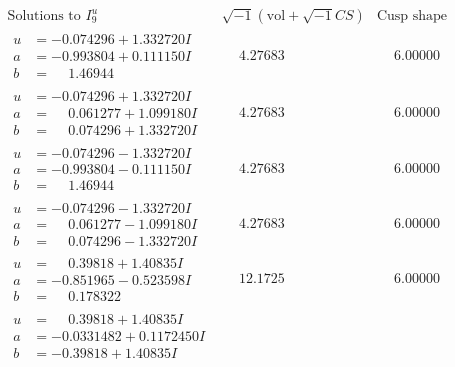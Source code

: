 \documentclass[1p]{elsarticle_modified}
\theoremstyle{definition}
\newcommand{\I}{\sqrt{-1}}
\begin{document}
$$\begin{array}{c|c|c}  
\text{Solutions to }I^u_{9}& \I (\text{vol} + \sqrt{-1}CS) & \text{Cusp shape}\\
 \hline 
\begin{aligned}
u &= -0.074296 + 1.332720 I \\
a &= -0.993804 + 0.111150 I \\
b &= \phantom{-}1.46944\phantom{ +0.000000I}\end{aligned}
 & \phantom{-}4.27683\phantom{ +0.000000I} & \phantom{-}6.00000\phantom{ +0.000000I} \\ \hline\begin{aligned}
u &= -0.074296 + 1.332720 I \\
a &= \phantom{-}0.061277 + 1.099180 I \\
b &= \phantom{-}0.074296 + 1.332720 I\end{aligned}
 & \phantom{-}4.27683\phantom{ +0.000000I} & \phantom{-}6.00000\phantom{ +0.000000I} \\ \hline\begin{aligned}
u &= -0.074296 - 1.332720 I \\
a &= -0.993804 - 0.111150 I \\
b &= \phantom{-}1.46944\phantom{ +0.000000I}\end{aligned}
 & \phantom{-}4.27683\phantom{ +0.000000I} & \phantom{-}6.00000\phantom{ +0.000000I} \\ \hline\begin{aligned}
u &= -0.074296 - 1.332720 I \\
a &= \phantom{-}0.061277 - 1.099180 I \\
b &= \phantom{-}0.074296 - 1.332720 I\end{aligned}
 & \phantom{-}4.27683\phantom{ +0.000000I} & \phantom{-}6.00000\phantom{ +0.000000I} \\ \hline\begin{aligned}
u &= \phantom{-}0.39818 + 1.40835 I \\
a &= -0.851965 - 0.523598 I \\
b &= \phantom{-}0.178322\phantom{ +0.000000I}\end{aligned}
 & \phantom{-}12.1725\phantom{ +0.000000I} & \phantom{-}6.00000\phantom{ +0.000000I} \\ \hline\begin{aligned}
u &= \phantom{-}0.39818 + 1.40835 I \\
a &= -0.0331482 + 0.1172450 I \\
b &= -0.39818 + 1.40835 I\end{aligned}

\end{array}$$
\end{document}
